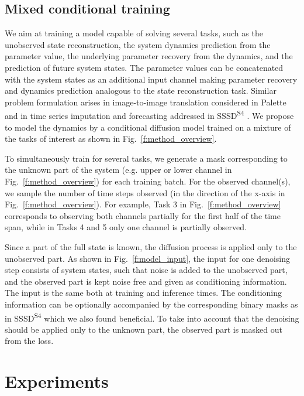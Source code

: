 \documentclass{article}
\begin{document}
\subsection{Mixed conditional training}
We aim at training a model capable of solving several tasks, such as the unobserved state reconstruction, the system dynamics prediction from the parameter value, the underlying parameter recovery from the dynamics, and the prediction of future system states. The parameter values can be concatenated with the system states as an additional input channel making parameter recovery and dynamics prediction analogous to the state reconstruction task.
Similar problem formulation arises in image-to-image translation considered in Palette \cite{saharia2022palette} and in time series imputation and forecasting addressed in SSSD\textsuperscript{S4} \cite{alcaraz2023diffusionbased}. 
We propose to model the dynamics by a conditional diffusion model trained on a mixture of the tasks of interest as shown in Fig.~\ref{f:method_overview}.

To simultaneously train for several tasks, we generate a mask corresponding to the unknown part of the system (e.g. upper or lower channel in Fig.~\ref{f:method_overview}) for each training batch. For the observed channel(s), we sample the number of time steps observed (in the direction of the x-axis in Fig.~\ref{f:method_overview}). For example, Task 3 in Fig.~\ref{f:method_overview} corresponds to observing both channels partially for the first half of the time span, while in Tasks 4 and 5 only one channel is partially observed.

Since a part of the full state is known, the diffusion process is applied only to the unobserved part. As shown in Fig.~\ref{f:model_input}, the input for one denoising step consists of system states, such that noise is added to the unobserved part, and the observed part is kept noise free and given as conditioning information. The input is the same both at training and inference times. The conditioning information can be optionally accompanied by the corresponding binary masks as in SSSD\textsuperscript{S4} which we also found beneficial. To take into account that the denoising should be applied only to the unknown part, the observed part is masked out from the loss.











\section{Experiments}
\end{document}
